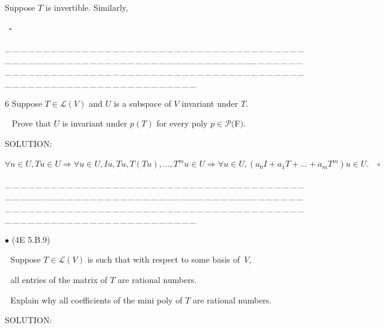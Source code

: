 \documentclass[a4paper, 11pt, UTF8]{article}
\def\Lm{\mathcal{L}}
\def\Po{\mathcal{P}}
\begin{document}
\begin{large}
Suppose $T$ is invertible. Similarly,\par\qquad\,
\quad$\square$\par
{\tiny \_\,\_\,\_\,\_\,\_\,\_\,\_\,\_\,\_\,\_\,\_\,\_\,\_\,\_\,\_\,\_\,\_\,\_\,\_\,\_\,\_\,\_\,\_\,\_\,\_\,\_\,\_\,\_\,\_\,\_\,\_\,\_\,\_\,\_\,\_\,\_\,\_\,\_\,\_\,\_\,\_\,\_\,\_\,\_\,\_\,\_\,\_\,\_\,\_\,\_\,\_\,\_\,\_\,\_\,\_\,\_\,\_\,\_\,\_\,\_\,\_\,\_\,\_\,\_\,\_\,\_\,\_\,\_\,\_\,\_\,\_\_\,\_\,\_\,\_\,\_\,\_\,\_\,\_\,\_\,\_\,\_\,\_\,\_\,\_\,\_\,\_\,\_\,\_\,\_\,\_\,\_\,\_\,\_\,\_\,\_\,\_\,\_\,\_\,\_\,\_\,\_\,\_\,\_\,\_\,\_\,\_\,\_\,\_\,\_\,\_\,\_\,\_\,\_\,\_\,\_\,\_\,\_\,\_\,\_\,\_\,\_\,\_\,\_\,\_\,\_\,\_\,\_\,\_\,\_\,\_\,\_\,\_\,\_\,\_\,\_\,\_\,\_\,\_\,\_\,\_\,\_}\par


{\timesbf\Large 6} {\timessl\Large 
Suppose $T\in\Lm(V)$ and $U$ is a subspace of $V$ invariant under $T$.}\par\,\,\,
{\timessl\Large Prove that $U$ is invariant under $p(T)$ for every poly $p\in\Po(${\timesbf F}$)$.
}\par
{\timesbf S\footnotesize{OLUTION:}}\par\quad
$\forall u\in U,Tu\in U\Rightarrow \forall u\in U,Iu,Tu,T(Tu),\dots,T^m u\in U\Rightarrow\forall u\in U,(a_0 I+a_1 T+\dots+a_m T^m)u\in U.\quad\square$
\par
{\tiny \_\,\_\,\_\,\_\,\_\,\_\,\_\,\_\,\_\,\_\,\_\,\_\,\_\,\_\,\_\,\_\,\_\,\_\,\_\,\_\,\_\,\_\,\_\,\_\,\_\,\_\,\_\,\_\,\_\,\_\,\_\,\_\,\_\,\_\,\_\,\_\,\_\,\_\,\_\,\_\,\_\,\_\,\_\,\_\,\_\,\_\,\_\,\_\,\_\,\_\,\_\,\_\,\_\,\_\,\_\,\_\,\_\,\_\,\_\,\_\,\_\,\_\,\_\,\_\,\_\,\_\,\_\,\_\,\_\,\_\,\_\_\,\_\,\_\,\_\,\_\,\_\,\_\,\_\,\_\,\_\,\_\,\_\,\_\,\_\,\_\,\_\,\_\,\_\,\_\,\_\,\_\,\_\,\_\,\_\,\_\,\_\,\_\,\_\,\_\,\_\,\_\,\_\,\_\,\_\,\_\,\_\,\_\,\_\,\_\,\_\,\_\,\_\,\_\,\_\,\_\,\_\,\_\,\_\,\_\,\_\,\_\,\_\,\_\,\_\,\_\,\_\,\_\,\_\,\_\,\_\,\_\,\_\,\_\,\_\,\_\,\_\,\_\,\_\,\_\,\_\,\_}\par

{\small $\bullet$} (\normalsize{4E 5.B.9})\par\,\, {\timessl\Large 
Suppose $T\in\Lm(V)$ is such that with respect to some basis of \,$V$,}\par\,\,
{\timessl\Large all entries of the matrix of $T$ are rational numbers.}\par\,\,
{\timessl\Large Explain why all coefficients of the mini poly of $T$ are rational numbers.
}\par
{\timesbf S\footnotesize{OLUTION:}}\par\quad


\end{large}
\end{document}
